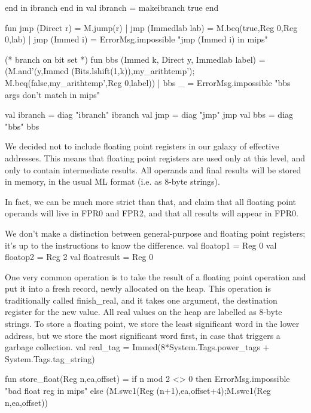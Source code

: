         end
in ibranch
end
in
val ibranch = makeibranch true
end
    
\endcode
{}
\endmoddef
fun jmp (Direct r) = M.jump(r)
  | jmp (Immedlab lab) = M.beq(true,Reg 0,Reg 0,lab)
  | jmp (Immed i) = ErrorMsg.impossible "jmp (Immed i) in mips"


        (* branch on bit set *)
fun bbs (Immed k, Direct y, Immedlab label) =
        (M.and'(y,Immed (Bits.lshift(1,k)),my_arithtemp');
         M.beq(false,my_arithtemp',Reg 0,label))
  | bbs _ = ErrorMsg.impossible "bbs args don't match in mips"

\endcode
{}
\endmoddef
val ibranch = diag "ibranch" ibranch
val jmp = diag "jmp" jmp
val bbs = diag "bbs" bbs

\endcode
{}
We decided not to include floating point registers in our galaxy of
effective addresses.
This means that floating point registers are used only at this level, and
only to contain intermediate results.
All operands and final results will be stored in memory, in the usual
ML format (i.e. as 8-byte strings).

In fact, we can be much more strict than that, and claim that
all floating point operands will live in FPR0 and FPR2, and that all 
results will appear in FPR0.

We don't make a distinction between general-purpose and floating point
registers; it's up to the instructions to know the difference.
\enddocs
{}
\endmoddef
val floatop1 = Reg 0
val floatop2 = Reg 2
val floatresult = Reg 0

\endcode
{}
One very common operation is to take the result of a floating point
operation and put it into a fresh record, newly allocated on the heap.
This operation is traditionally called \code{}finish_real\edoc{}, and it takes one
argument, the destination register for the new value.
All real values on the heap are labelled as 8-byte strings.
To store a floating point, we store the least significant
word in the lower address, but we store the most significant word
first, in case that triggers a garbage collection.
\enddocs
{}
\endmoddef
val real_tag = Immed(8*System.Tags.power_tags + System.Tags.tag_string)

fun store_float(Reg n,ea,offset) = 
    if n mod 2 <> 0 then ErrorMsg.impossible "bad float reg in mips"
    else (M.swc1(Reg (n+1),ea,offset+4);M.swc1(Reg n,ea,offset))

